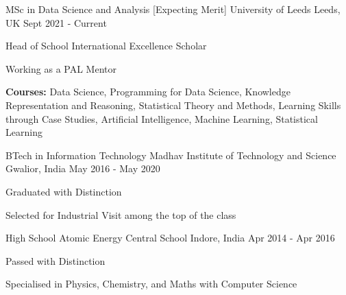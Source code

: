 

\begin{cventries}

  \cventry
    {MSc in Data Science and Analysis [Expecting Merit]} %
    {University of Leeds} %
    {Leeds, UK} %
    {Sept 2021 - Current} %
    {
      \begin{cvitems} %
        \item {Head of School International Excellence Scholar}
        \item {Working as a PAL Mentor}
        \item {\textbf{Courses:} Data Science, Programming for Data Science, Knowledge Representation and Reasoning, Statistical Theory and Methods, Learning Skills through Case Studies, Artificial Intelligence, Machine Learning, Statistical Learning}
      \end{cvitems}
    }
    
  \cventry
    {BTech in Information Technology} %
    {Madhav Institute of Technology and Science} %
    {Gwalior, India} %
    {May 2016 - May 2020} %
    {
      \begin{cvitems} %
        \item {Graduated with Distinction}
        \item {Selected for Industrial Visit among the top of the class} 
      \end{cvitems}
    }
    
  \cventry
    {High School} %
    {Atomic Energy Central School} %
    {Indore, India} %
    {Apr 2014 - Apr 2016} %
    {
      \begin{cvitems} %
        \item {Passed with Distinction}
        \item {Specialised in Physics, Chemistry, and Maths with Computer Science}
      \end{cvitems}
    }
\end{cventries}
